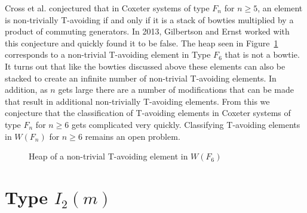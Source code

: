 Cross et al. conjectured that in Coxeter systems of type $F_n$ for $n \geq 5$, an element is non-trivially T-avoiding if and only if it is a stack of bowties multiplied by a product of commuting generators. In 2013, Gilbertson and Ernst worked with this conjecture and quickly found it to be false. The heap seen in Figure~\ref{fig:f6bat} corresponds to a non-trivial T-avoiding element in Type $F_6$ that is not a bowtie. It turns out that like the bowties discussed above these elements can also be stacked to create an infinite number of non-trivial T-avoiding elements. In addition, as $n$ gets large there are a number of modifications that can be made that result in additional non-trivially T-avoiding elements. From this we conjecture that the classification of T-avoiding elements in Coxeter systems of type $F_n$ for $n \geq 6$ gets complicated very quickly. Classifying T-avoiding elements in $W(F_n)$ for $n \geq 6$ remains an open problem. 

\begin{figure}[h!]\centering
{}
\caption{Heap of a non-trivial T-avoiding element in $W(F_6)$}\label{fig:f6bat}
\end{figure}


\section{Type $I_2(m)$}\label{sec:tavoidI}

